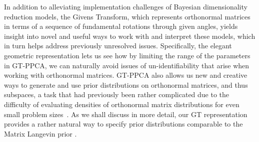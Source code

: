 \documentclass{article}
\begin{document}
In addition to alleviating implementation challenges of Bayesian dimensionality reduction models, the Givens Transform, which represents orthonormal matrices in terms of a sequence of fundamental rotations through given angles, yields insight into novel and useful ways to work with and interpret these models, which in turn helps address previously unresolved issues.  Specifically, the elegant geometric representation lets us see how by limiting the range of the parameters in GT-PPCA, we can naturally avoid issues of un-identifiability that arise when working with orthonormal matrices.  GT-PPCA also allows us new and creative ways to generate and use prior distributions on orthonormal matrices, and thus subspaces, a task that had previously been rather complicated due to the difficulty of evaluating densities of orthonormal matrix distributions for even small problem sizes~\citep{hoff2009simulation}.  As we shall discuss in more detail, our GT representation provides a rather natural way to specify prior distributions comparable to the Matrix Langevin prior \citep{muirhead2009aspects}.

\end{document}
